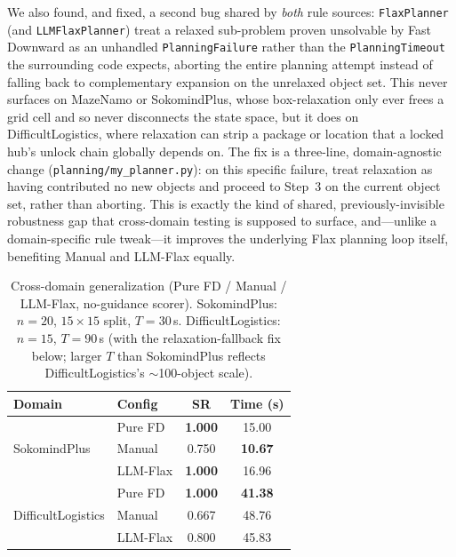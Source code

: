 \documentclass[letterpaper, 10pt, journal, twoside]{IEEEtran}
\newcommand{\method}{LLM-Flax\xspace}
\newcommand{\baseline}{Flax\xspace}
\begin{document}
We also found, and fixed, a second bug shared by \emph{both} rule sources: \texttt{FlaxPlanner} (and \texttt{LLMFlaxPlanner}) treat a relaxed sub-problem proven unsolvable by Fast Downward as an unhandled \texttt{PlanningFailure} rather than the \texttt{PlanningTimeout} the surrounding code expects, aborting the entire planning attempt instead of falling back to complementary expansion on the unrelaxed object set.
This never surfaces on MazeNamo or SokomindPlus, whose box-relaxation only ever frees a grid cell and so never disconnects the state space, but it does on DifficultLogistics, where relaxation can strip a package or location that a locked hub's unlock chain globally depends on.
The fix is a three-line, domain-agnostic change (\texttt{planning/my\_planner.py}): on this specific failure, treat relaxation as having contributed no new objects and proceed to Step~3 on the current object set, rather than aborting.
This is exactly the kind of shared, previously-invisible robustness gap that cross-domain testing is supposed to surface, and---unlike a domain-specific rule tweak---it improves the underlying \baseline planning loop itself, benefiting Manual and \method equally.

\begin{table}[t]
    \centering
    \caption{Cross-domain generalization (Pure FD / Manual / \method, no-guidance scorer). SokomindPlus: $n{=}20$, $15{\times}15$ split, $T{=}30$\,s. DifficultLogistics: $n{=}15$, $T{=}90$\,s (with the relaxation-fallback fix below; larger $T$ than SokomindPlus reflects DifficultLogistics's $\sim$100-object scale).}
    \label{tab:crossdomain}
    \small
    \setlength{\tabcolsep}{4pt}
    \renewcommand{\arraystretch}{1.1}
    \begin{tabular}{llcc}
        \toprule
        \textbf{Domain} & \textbf{Config} & \textbf{SR} & \textbf{Time (s)} \\
        \midrule
        \multirow{3}{*}{SokomindPlus}
            & Pure FD  & \textbf{1.000} & 15.00 \\
            & Manual   & 0.750          & \textbf{10.67} \\
            & \method  & \textbf{1.000} & 16.96 \\
        \midrule
        \multirow{3}{*}{DifficultLogistics}
            & Pure FD  & \textbf{1.000} & \textbf{41.38} \\
            & Manual   & 0.667          & 48.76 \\
            & \method  & 0.800          & 45.83 \\
        \bottomrule
    \end{tabular}
\end{table}
\end{document}
